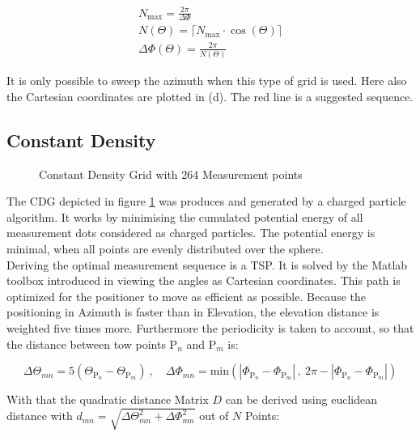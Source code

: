 \begin{align}
N_{\text{max}} = \frac{2\pi}{\Delta\Phi}\\
N\left(\Theta\right)=\lceil N_{\text{max}}\cdot\cos\left(\Theta\right)\rceil\\
\Delta\Phi\left(\Theta\right) = \frac{2\pi}{N\left(\Theta\right)}
\end{align}

It is only possible to sweep the azimuth when this type of grid is used. Here also the Cartesian coordinates are plotted in (d). The red line is a suggested sequence.

\subsection{Constant Density}

\begin{figure}[h]
  \centering
  \centering
\caption{Constant Density Grid with 264 Measurement points}
\label{fig:cdg}
\end{figure}

The \ac{CDG} depicted in figure \ref{fig:cdg} was produces and generated by a charged particle algorithm. It works by minimising the cumulated potential energy of all measurement dots considered as charged particles. The potential energy is minimal, when all points are evenly distributed over the sphere.\\ 
Deriving the optimal measurement sequence is a \ac{TSP}. It is solved by the Matlab toolbox introduced in \cite{tsp} viewing the angles as Cartesian coordinates. This path is optimized for the positioner to move as efficient as possible. Because the positioning in Azimuth is faster than in Elevation, the elevation distance is weighted five times more. Furthermore the periodicity is taken to account, so that the distance between tow points $\text{P}_n$ and $\text{P}_m$ is:

\begin{equation}
\Delta\Theta_{mn} = 5\left(\Theta_{\text{P}_n}-\Theta_{\text{P}_m}\right)\ ,\quad \Delta\Phi_{mn} = \text{min}\left(|\Phi_{\text{P}_n}-\Phi_{\text{P}_m}|\, ,\ 2\pi-|\Phi_{\text{P}_n}-\Phi_{\text{P}_m}|\right)
\end{equation}

With that the quadratic distance Matrix $D$ can be derived using euclidean distance with $d_{mn} = \sqrt{\Delta\Theta_{mn}^2+\Delta\Phi_{mn}^2}$ out of $N$ Points:

